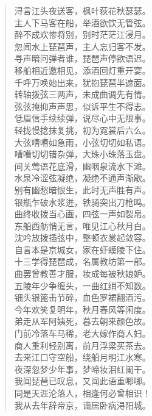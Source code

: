 \documentclass[12pt,oneside]{book}
\newenvironment{shici}{
\begin{verse}
\centering\large\hspace{12pt}}
{\end{verse}}
\begin{document}
\begin{shici}
浔言江头夜送客，枫叶荻花秋瑟瑟。\\
主人下马客在船，举酒欲饮无管弦。\\
醉不成欢惨将别，别时茫茫江浸月。\\
忽闻水上琵琶声，主人忘归客不发。\\
寻声暗问弹者谁，琵琶声停欲语迟。\\
移船相近邀相见，添酒回灯重开宴。\\
千呼万唤始出来，犹抱琵琶半遮面。\\
转轴拨弦三两声，未成曲调先有情。\\
弦弦掩抑声声思，似诉平生不得志。\\
低眉信手续续弹，说尽心中无限事。\\
轻拢慢捻抹复挑，初为霓裳后六么。\\
大弦嘈嘈如急雨，小弦切切如私语。\\
嘈嘈切切错杂弹，大珠小珠落玉盘。\\
间关莺语花底滑，幽咽泉流水下滩。\\
水泉冷涩弦凝绝，凝绝不通声渐歇。\\
别有幽愁暗恨生，此时无声胜有声。\\
银瓶乍破水浆迸，铁骑突出刀枪鸣。\\
曲终收拨当心画，四弦一声如裂帛。\\
东船西舫悄无言，唯见江心秋月白。\\
沈吟放拨插弦中，整顿衣裳起敛容。\\
自言本是京城女，家在虾蟆陵下住。\\
十三学得琵琶成，名属教坊第一部。\\
曲罢曾教善才服，妆成每被秋娘妒。\\
五陵年少争缠头，一曲红绡不知数。\\
钿头银篦击节碎，血色罗裙翻酒污。\\
今年欢笑复明年，秋月春风等闲度。\\
弟走从军阿姨死，暮去朝来颜色故。\\
门前冷落车马稀，老大嫁作商人妇。\\
商人重利轻别离，前月浮梁买茶去。\\
去来江口守空船，绕船月明江水寒。\\
夜深忽梦少年事，梦啼妆泪红阑干。\\
我闻琵琶已叹息，又闻此语重唧唧。\\
同是天涯沦落人，相逢何必曾相识！\\
我从去年辞帝京，谪居卧病浔阳城。\\

\end{shici}
\end{document}

